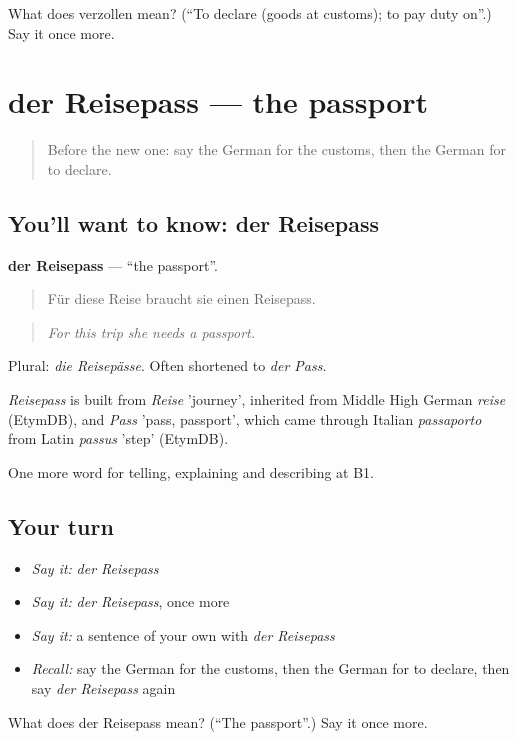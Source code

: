 \begin{tcolorbox}[breakable,colback=teal!4,colframe=teal!35!black,title={Before you move on}]
What does verzollen mean? (\textquotedblleft{}To declare (goods at customs); to pay duty on\textquotedblright{}.) Say it once more.
\end{tcolorbox}
\section[der Reisepass]{der Reisepass — the passport}

\label{lesson:GE-C417-reisepass}



\begin{quote}
Before the new one: say the German for the customs, then the German for to declare.
\end{quote}

\subsection*{You'll want to know: der Reisepass}
\textbf{der Reisepass} — \textquotedblleft{}the passport\textquotedblright{}.

\begin{quote}
Für diese Reise braucht sie einen Reisepass.
\end{quote}

\begin{quote}
\emph{For this trip she needs a passport.}
\end{quote}

Plural: \emph{die Reisepässe}. Often shortened to \emph{der Pass}.

\begin{cousinweb}
\emph{Reisepass} is built from \emph{Reise} 'journey', inherited from Middle High German \emph{reise} (EtymDB), and \emph{Pass} 'pass, passport', which came through Italian \emph{passaporto} from Latin \emph{passus} 'step' (EtymDB).
\end{cousinweb}

\begin{grammarlens}[title={What you've built}]
One more word for telling, explaining and describing at B1.
\end{grammarlens}

\subsection*{Your turn}
\begin{itemize}
\raggedright
  \item \emph{Say it:} \emph{der Reisepass}
  \item \emph{Say it:} \emph{der Reisepass}, once more
  \item \emph{Say it:} a sentence of your own with \emph{der Reisepass}
  \item \emph{Recall:} say the German for the customs, then the German for to declare, then say \emph{der Reisepass} again
\end{itemize}

\begin{tcolorbox}[breakable,colback=teal!4,colframe=teal!35!black,title={Before you move on}]
What does der Reisepass mean? (\textquotedblleft{}The passport\textquotedblright{}.) Say it once more.
\end{tcolorbox}
